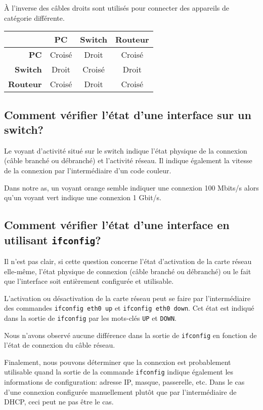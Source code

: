 \documentclass[11pt,a4paper]{article}
\begin{document}
À l'inverse des câbles droits sont utilisés pour connecter des appareils de catégorie différente.

\begin{center}
\begin{tabular}{r|ccc}
	& \textbf{PC} & \textbf{Switch} & \textbf{Routeur} \\
	\hline
	\textbf{PC}      & Croisé & Droit  & Croisé \\
	\textbf{Switch}  & Droit  & Croisé & Droit  \\
	\textbf{Routeur} & Croisé & Droit  & Croisé \\
\end{tabular}
\end{center}

\subsection{Comment vérifier l'état d'une interface sur un switch?}

Le voyant d'activité situé sur le switch indique l'état physique de la connexion (câble branché ou débranché) et l'activité réseau. Il indique également la vitesse de la connexion par l'intermédiaire d'un code couleur.

Dans notre as, un voyant orange semble indiquer une connexion 100 Mbits/s alors qu'un voyant vert indique une connexion 1 Gbit/s.

\subsection{Comment vérifier l'état d'une interface en utilisant \texttt{ifconfig}?}

Il n'est pas clair, si cette question concerne l'état d'activation de la carte réseau elle-même, l'état physique de connexion (câble branché ou débranché) ou le fait que l'interface soit entièrement configurée et utilisable.

L'activation ou désactivation de la carte réseau peut se faire par l'intermédiaire des commandes \texttt{ifconfig eth0 up} et \texttt{ifconfig eth0 down}. Cet état est indiqué dans la sortie de \texttt{ifconfig} par les mots-clés \texttt{UP} et \texttt{DOWN}.

Nous n'avons observé aucune différence dans la sortie de \texttt{ifconfig} en fonction de l'état de connexion du câble réseau.

Finalement, nous pouvons déterminer que la connexion est probablement utilisable quand la sortie de la commande \texttt{ifconfig} indique également les informations de configuration: adresse IP, masque, passerelle, etc. Dans le cas d'une connexion configurée manuellement plutôt que par l'intermédiaire de DHCP, ceci peut ne pas être le cas.
\end{document}
